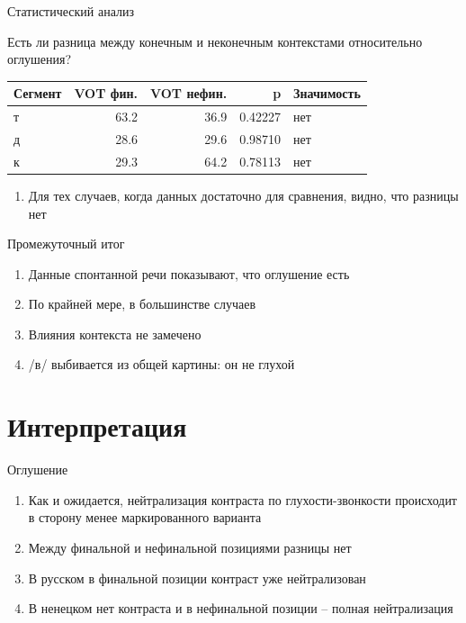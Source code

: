 \documentclass[10 pt, handout]{beamer}
\begin{document}
\begin{frame}{Статистический анализ}

	Есть ли разница между конечным и неконечным контекстами относительно оглушения?
	\vfill

\begin{tabular}{lrrrl}
\toprule
\textbf{Сегмент} &  \textbf{VOT фин.} &  \textbf{VOT нефин.} &       \textbf{p} & \textbf{Значимость} \\
\midrule
      т &      63.2 &      36.9 & 0.42227 &         нет \\
      д &      28.6 &      29.6 & 0.98710 &         нет \\
      к &      29.3 &      64.2 & 0.78113 &         нет \\
\bottomrule
\end{tabular}

	\vfill
	\begin{enumerate}[$\gg$]
		\item Для тех случаев, когда данных достаточно для сравнения, видно, что разницы нет
	\end{enumerate}

\end{frame}

\begin{frame}{Промежуточный итог}

	\begin{enumerate}[$\gg$]
		\item Данные спонтанной речи показывают, что оглушение есть
		\item По крайней мере, в большинстве случаев
		\item Влияния контекста не замечено
		\item /в/ выбивается из общей картины: он не глухой
	\end{enumerate}

\end{frame}

	\section{Интерпретация}

\begin{frame}{Оглушение}

	\begin{enumerate}[$\gg$]
		\item Как и ожидается, нейтрализация контраста по глухости-звонкости происходит в сторону менее маркированного варианта
		\item Между финальной и нефинальной позициями разницы нет
		\item В русском в финальной позиции контраст уже нейтрализован
		\item В ненецком нет контраста и в нефинальной позиции -- полная нейтрализация
	\end{enumerate}

\end{frame}
\end{document}

